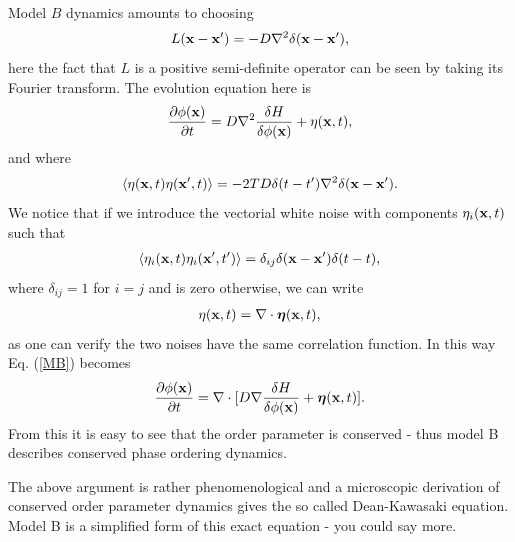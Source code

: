 Model $B$ dynamics amounts to choosing
\begin{align}
L({\bf x}-{\bf x}')= -D\nabla^2 \delta({\bf x}-{\bf x'}),
\end{align}
here the fact that $L$ is a positive semi-definite operator can be seen by taking its Fourier transform. The evolution equation here is
\begin{align}
\frac{\partial \phi({\bf x})}{\partial t}= D\nabla^2 \frac{\delta H}{\delta \phi({\bf x})} + \eta({\bf x},t),
\label{MB}
\end{align}
and where
\begin{align}
\langle \eta({\bf x},t)\eta({\bf x}',t)\rangle =-2TD   \delta(t-t')\nabla^2\delta({\bf x}-{\bf x'}).
\end{align}
We notice that if we introduce the vectorial white noise with components $\eta_i({\bf x},t)$ such that
\begin{align}
\langle \eta_i({\bf x},t) \eta_i({\bf x}',t')\rangle =\delta_{ij} \delta({\bf x}-{\bf x'})\delta(t-t),
\end{align}
where $\delta_{ij}=1$ for $i=j$ and is zero otherwise,  we can write
\begin{align}
\eta({\bf x},t)= \nabla\cdot {\boldsymbol \eta}({\bf x},t),
\end{align}
as one can verify the two noises have the same correlation function. In this way Eq. (\ref{MB}) becomes 
\begin{align}
\frac{\partial \phi({\bf x})}{\partial t}= \nabla\cdot[ D\nabla \frac{\delta H}{\delta \phi({\bf x})} + {\boldsymbol\eta}({\bf x},t)].
\end{align}
From this it is easy to see that the order parameter is conserved - thus model  B describes conserved phase ordering dynamics.

The above argument is rather phenomenological and a microscopic derivation of conserved order parameter dynamics gives the so called Dean-Kawasaki equation. Model B is a simplified form of this exact equation - you could say more.



